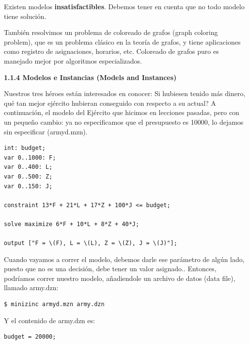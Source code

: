 \documentclass[12pt]{article}
\begin{document}
\begin{justify}
Existen modelos \textbf{insatisfactibles}. Debemos tener en cuenta que no todo modelo tiene solución.
\end{justify}

\begin{justify}
También resolvimos un problema de coloreado de grafos (graph coloring problem), que es un problema clásico en la teoría de grafos, y tiene aplicaciones como registro de asignaciones, horarios, etc. Coloreado de grafos puro es manejado mejor por algoritmos especializados.
\end{justify}

\newpage

\textbf{1.1.4 Modelos e Instancias (Models and Instances)}

\begin{justify}
Nuestros tres héroes están interesados en conocer: Si hubiesen tenido más dinero, qué tan mejor ejército hubieran conseguido con respecto a su actual? A continuación, el modelo del Ejército que hicimos en lecciones pasadas, pero con un pequeño cambio: ya no especificamos que el presupuesto es 10000, lo dejamos sin especificar (armyd.mzn).
\end{justify}

\begin{Verbatim}
int: budget;
var 0..1000: F;
var 0..400: L;
var 0..500: Z;
var 0..150: J;

constraint 13*F + 21*L + 17*Z + 100*J <= budget;

solve maximize 6*F + 10*L + 8*Z + 40*J;

output ["F = \(F), L = \(L), Z = \(Z), J = \(J)"];
\end{Verbatim}

\begin{justify}
Cuando vayamos a correr el modelo, debemos darle ese parámetro de algún lado, puesto que no es una decisión, debe tener un valor asignado.. Entonces, podríamos correr nuestro modelo, añadiendole un archivo de datos (data file), llamado army.dzn:
\end{justify}

\begin{Verbatim}
$ minizinc armyd.mzn army.dzn
\end{Verbatim}

\begin{justify}
Y el contenido de army.dzn es:
\end{justify}

\begin{Verbatim}
budget = 20000;
\end{Verbatim}
\end{document}
